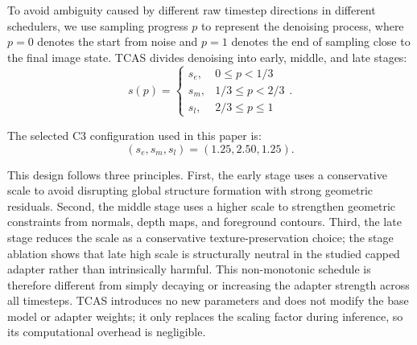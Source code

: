 \documentclass[times,twocolumn,final]{elsarticle}
\begin{document}
To avoid ambiguity caused by different raw timestep directions in different schedulers, we use sampling progress $p$ to represent the denoising process, where $p = 0$ denotes the start from noise and $p = 1$ denotes the end of sampling close to the final image state. TCAS divides denoising into early, middle, and late stages:
\begin{equation}
s(p) = \begin{cases} s_e, & 0 \leq p < 1/3 \\ s_m, & 1/3 \leq p < 2/3 \\ s_l, & 2/3 \leq p \leq 1 \end{cases}.
\label{eq:tcas}
\end{equation}

The selected C3 configuration used in this paper is:
\begin{equation}
(s_e, s_m, s_l) = (1.25, 2.50, 1.25).
\end{equation}

This design follows three principles. First, the early stage uses a conservative scale to avoid disrupting global structure formation with strong geometric residuals. Second, the middle stage uses a higher scale to strengthen geometric constraints from normals, depth maps, and foreground contours. Third, the late stage reduces the scale as a conservative texture-preservation choice; the stage ablation shows that late high scale is structurally neutral in the studied capped adapter rather than intrinsically harmful. This non-monotonic schedule is therefore different from simply decaying or increasing the adapter strength across all timesteps. TCAS introduces no new parameters and does not modify the base model or adapter weights; it only replaces the scaling factor during inference, so its computational overhead is negligible.
\end{document}
